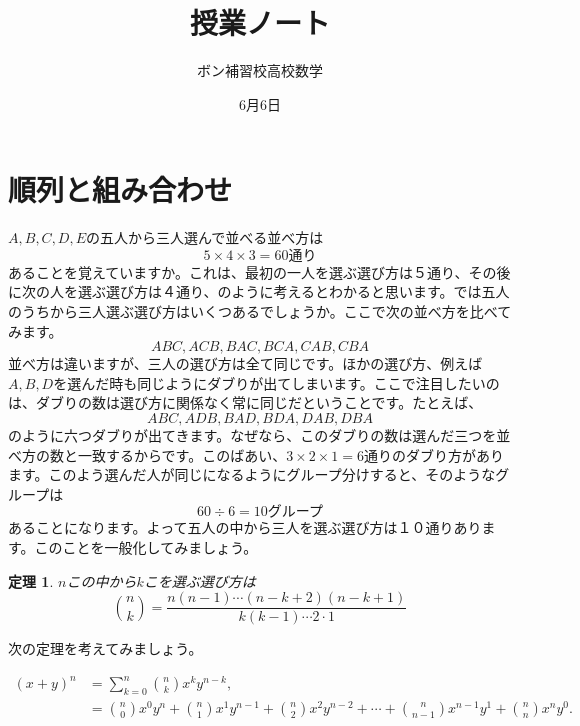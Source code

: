 \documentclass{ltjsarticle}
\title{授業ノート}
\author{ボン補習校高校数学}
\date{6月6日}
\newtheorem{theorem}{定理}[section]
\begin{document}
\maketitle

\section{順列と組み合わせ}

$A,B,C,D,E$の五人から三人選んで並べる並べ方は
\begin{equation*}
5\times 4\times 3 =60\text{通り}
\end{equation*}
あることを覚えていますか。これは、最初の一人を選ぶ選び方は５通り、その後に次の人を選ぶ選び方は４通り、のように考えるとわかると思います。では五人のうちから三人選ぶ選び方はいくつあるでしょうか。ここで次の並べ方を比べてみます。
\begin{equation*}
ABC, ACB,BAC,BCA,CAB,CBA
\end{equation*}
並べ方は違いますが、三人の選び方は全て同じです。ほかの選び方、例えば$A,B,D$を選んだ時も同じようにダブりが出てしまいます。ここで注目したいのは、ダブりの数は選び方に関係なく常に同じだということです。たとえば、
\begin{equation*}
ABC,ADB,BAD,BDA,DAB,DBA
\end{equation*}
のように六つダブりが出てきます。なぜなら、このダブりの数は選んだ三つを並べ方の数と一致するからです。このばあい、$3\times2\times1=6$通りのダブり方があります。このよう選んだ人が同じになるようにグループ分けすると、そのようなグループは
\begin{equation*}
60\div 6 = 10\text{グループ}
\end{equation*}
あることになります。よって五人の中から三人を選ぶ選び方は１０通りあります。このことを一般化してみましょう。

\begin{theorem}
$n$この中から$k$こを選ぶ選び方は
\begin{equation*}
{n\choose k} = {\frac {n(n-1)\cdots (n-k+2)(n-k+1)} {k(k-1)\cdots 2\cdot 1}}
\end{equation*}
\end{theorem}



次の定理を考えてみましょう。

\begin{align*}
(x+y)^n &= \sum_{k=0}^n {n\choose k}x^ky^{n-k},\\
&  =  {n\choose 0}x^0y^{n}+{n\choose 1}x^1y^{n-1}+{n\choose 2}x^2y^{n-2}+\cdots+{n\choose n-1}x^{n-1}y^{1}+{n\choose n}x^ny^{0}.
\end{align*}
\end{document}

